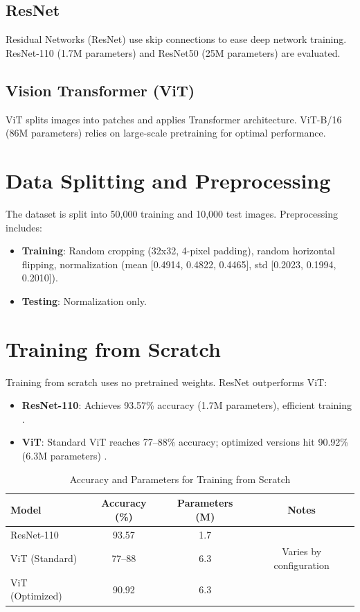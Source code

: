 \documentclass[UTF8]{report}
\theoremstyle{MyLineTheoremStyle} %
\theoremstyle{MyBlockTheoremStyle} %
\theoremstyle{MySubsubsectionStyle} %
\begin{document}
\subsection*{ResNet}
Residual Networks (ResNet) use skip connections to ease deep network training. ResNet-110 (1.7M parameters) and ResNet50 (25M parameters) are evaluated.

\subsection*{Vision Transformer (ViT)}
ViT splits images into patches and applies Transformer architecture. ViT-B/16 (86M parameters) relies on large-scale pretraining for optimal performance.

\section*{Data Splitting and Preprocessing}
The dataset is split into 50,000 training and 10,000 test images. Preprocessing includes:
\begin{itemize}
    \item \textbf{Training}: Random cropping (32x32, 4-pixel padding), random horizontal flipping, normalization (mean [0.4914, 0.4822, 0.4465], std [0.2023, 0.1994, 0.2010]).
    \item \textbf{Testing}: Normalization only.
\end{itemize}

\section*{Training from Scratch}
Training from scratch uses no pretrained weights. ResNet outperforms ViT:
\begin{itemize}
    \item \textbf{ResNet-110}: Achieves 93.57\% accuracy (1.7M parameters), efficient training \cite{he2016deep}.
    \item \textbf{ViT}: Standard ViT reaches 77–88\% accuracy; optimized versions hit 90.92\% (6.3M parameters) \cite{omihub777vitcifar, kentaroy47vit}.
\end{itemize}

\begin{table}[h]
\centering
\caption{Accuracy and Parameters for Training from Scratch}
\begin{tabular}{lccc}
\toprule
Model & Accuracy (\%) & Parameters (M) & Notes \\
\midrule
ResNet-110 & 93.57 & 1.7 & \cite{he2016deep} \\
ViT (Standard) & 77–88 & 6.3 & Varies by configuration \cite{kentaroy47vit} \\
ViT (Optimized) & 90.92 & 6.3 & \cite{omihub777vitcifar} \\
\bottomrule
\end{tabular}
\end{table}
\end{document}
